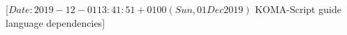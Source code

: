 %
%
%
%
%
%
%
%
% 
%
%
%
%
%
                 [$Date: 2019-12-01 13:41:51 +0100 (Sun, 01 Dec 2019) $
                  KOMA-Script guide language dependencies]
%
%
